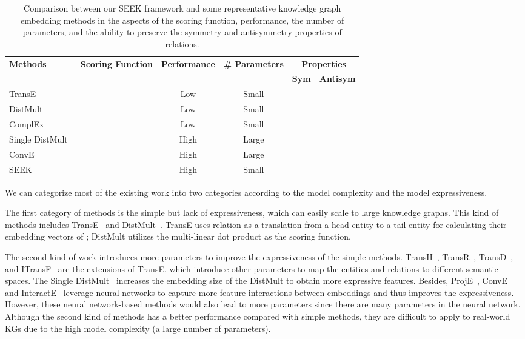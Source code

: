 \documentclass[11pt,a4paper]{article}
\newcommand{\cmark}{\text{\ding{51}}}
\newcommand{\xmark}{\text{\ding{55}}}
\newcommand{\TableSize}{\footnotesize} \renewcommand{\thefootnote}{\fnsymbol{footnote}}
\begin{document}
\begin{table*}[!h]
	\centering
	\TableSize
	\begin{tabular}{ l |c| c | c | c c}
		\toprule
		\multirow{2}{*}{\textbf{Methods}} & \multirow{2}{*}{\textbf{Scoring Function}} &  \multirow{2}{*}{\textbf{Performance}} & \multirow{2}{*}{\textbf{\# Parameters}} &\multicolumn{2}{c}{\textbf{Properties}} \\
		\cmidrule{5-6}
		& & & & \textbf{Sym}  & \textbf{Antisym}\\
		\midrule
		TransE~\cite{bordes2013translating} &  & Low & Small & \xmark & \cmark\\
		DistMult~\cite{yang2015embedding} &  & Low  & Small & \cmark & \xmark\\
ComplEx~\cite{trouillon2016complex} &  & Low   & Small  & \cmark & \cmark\\
		Single DistMult~\cite{kadlec2017knowledge} & & High  & Large & \cmark & \xmark\\
		ConvE~\cite{dettmers2018conve} & & High  & Large & \xmark &  \cmark\\
		\midrule
		SEEK &   & High  & Small & \cmark & \cmark\\
		\bottomrule
	\end{tabular}
	\caption{Comparison between our SEEK framework and some representative knowledge graph embedding methods in the aspects of the scoring function, performance, the number of parameters, and the ability to preserve the symmetry and antisymmetry properties of relations.}	
	\label{tab:compare}
\end{table*}

We can categorize most of the existing work into two categories according to the model complexity and the model expressiveness.

The first category of methods is the simple but lack of expressiveness, which can easily scale to large knowledge graphs. This kind of methods includes TransE~\cite{bordes2013translating} and DistMult~\cite{yang2015embedding}. TransE uses relation  as a translation from a head entity  to a tail entity  for calculating their embedding vectors of ; DistMult utilizes the multi-linear dot product as the scoring function.

The second kind of work introduces more parameters to improve the expressiveness of the simple methods. TransH~\cite{wang2014knowledge}, TransR~\cite{lin2015learning}, TransD~\cite{ji2015knowledge}, and ITransF~\cite{xie2017interpretable} are the extensions of TransE, which introduce other parameters to map the entities and relations to different semantic spaces. The Single DistMult~\cite{kadlec2017knowledge} increases the embedding size of the DistMult to obtain more expressive features. Besides, ProjE~\cite{shi2017proje}, ConvE~\cite{dettmers2018conve} and InteractE~\cite{vashishth2019interacte} leverage neural networks to capture more feature interactions between embeddings and thus improves the expressiveness. However, these neural network-based methods would also lead to more parameters since there are many parameters in the neural network. Although the second kind of methods has a better performance compared with simple methods, they are difficult to apply to real-world KGs due to the high model complexity (a large number of parameters).
\end{document}
